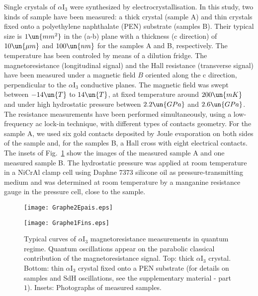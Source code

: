 \documentclass[doublecol]{epl2}
\begin{document}
Single crystals of $\alpha$I$_{3}$ were synthesized by electrocrystallisation. In this study, two kinds of sample have been measured: a thick crystal (sample A) and thin crystals fixed onto a polyethylene naphthalate (PEN) substrate (samples B). Their typical size is $1\un{mm^2}$ in the (a-b) plane with a thickness (c direction) of $10\un{\mu m}$ and $100\un{nm}$ for the samples A and B, respectively. The temperature has been controled by means of a dilution fridge. The magnetoresistance (longitudinal signal) and the Hall resistance (transverse signal) have been measured under a magnetic field $B$ oriented along the c direction, perpendicular to the $\alpha$I$_{3}$ conductive planes. The magnetic field was swept between $-14\un{T}$ to $14\un{T}$, at fixed temperature around $200\un{mK}$ and under high hydrostatic pressure between $2.2\un{GPa}$ and $2.6\un{GPa}$. The resistance measurements have been performed simultaneously, using a low-frequency ac lock-in technique, with different types of contacts geometry. For the sample A, we used six gold contacts deposited by Joule evaporation on both sides of the sample and, for the samples B, a Hall cross with eight electrical contacts. The insets of Fig.~\ref{fig.1} show the images of the measured sample A and one measured sample B. The hydrostatic pressure was applied at room temperature in a NiCrAl clamp cell using Daphne $7373$ silicone oil as pressure-transmitting medium and was determined at room temperature by a manganine resistance gauge in the pressure cell, close to the sample. 
\begin{figure}
\begin{center}
\texttt{[image: Graphe2Epais.eps]}

\texttt{[image: Graphe1Fins.eps]}
\end{center}
\vspace{-0.3cm}
\caption{Typical curves of $\alpha$I$_{3}$ magnetoresistance measurements in quantum regime. Quantum oscillations appear on the parabolic classical contribution of the magnetoresistance signal. Top: thick $\alpha$I$_{3}$ crystal. Bottom: thin $\alpha$I$_{3}$ crystal fixed onto a PEN substrate (for details on samples and SdH oscillations, see the supplementary material - part $1$). Insets: Photographs of measured samples.}
\label{fig.1}
\end{figure}
\end{document}
